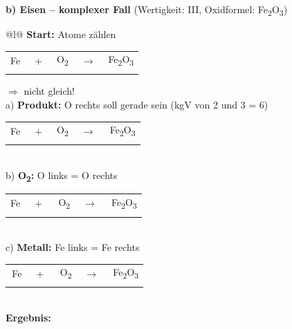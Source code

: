 \documentclass[10pt, a4paper]{article}
\newcommand{\luecke}[1]{\underline{\hspace{#1}}}
\begin{document}
\vspace{8pt}

\textbf{b) Eisen – komplexer Fall} (Wertigkeit: III, Oxidformel: Fe\textsubscript{2}O\textsubscript{3})

\begin{tabular}{@{}l@{}}
\textbf{Start:} Atome zählen \\[0.3em]
\hspace{1em}\begin{tabular}[t]{@{}c@{}c@{}c@{}c@{}c@{}}
Fe & $\;+\;$ & O\textsubscript{2} & $\;\rightarrow\;$ & Fe\textsubscript{2}O\textsubscript{3} \\[-0.2em]
{\scriptsize\luecke{0.4cm}} & & {\scriptsize\luecke{0.4cm}} & & {\scriptsize\luecke{0.4cm}\hspace{0.5em}\luecke{0.4cm}}
\end{tabular} \quad $\Rightarrow$ nicht gleich! \\[0.8em]
%
a) \textbf{Produkt:} O rechts soll gerade sein (kgV von 2 und 3 = 6) \\[0.3em]
\hspace{1em}\begin{tabular}[t]{@{}c@{}c@{}c@{}c@{}c@{}}
Fe & $\;+\;$ & O\textsubscript{2} & $\;\rightarrow\;$ & \luecke{0.4cm}\,Fe\textsubscript{2}O\textsubscript{3} \\[-0.2em]
{\scriptsize\luecke{0.4cm}} & & {\scriptsize\luecke{0.4cm}} & & {\scriptsize\luecke{0.4cm}\hspace{0.5em}\luecke{0.4cm}}
\end{tabular} \\[0.8em]
%
b) \textbf{O\textsubscript{2}:} O links = O rechts \\[0.3em]
\hspace{1em}\begin{tabular}[t]{@{}c@{}c@{}c@{}c@{}c@{}}
Fe & $\;+\;$ & \luecke{0.4cm}\,O\textsubscript{2} & $\;\rightarrow\;$ & \luecke{0.4cm}\,Fe\textsubscript{2}O\textsubscript{3} \\[-0.2em]
{\scriptsize\luecke{0.4cm}} & & {\scriptsize\luecke{0.4cm}} & & {\scriptsize\luecke{0.4cm}\hspace{0.5em}\luecke{0.4cm}}
\end{tabular} \\[0.8em]
%
c) \textbf{Metall:} Fe links = Fe rechts \\[0.3em]
\hspace{1em}\begin{tabular}[t]{@{}c@{}c@{}c@{}c@{}c@{}}
\luecke{0.4cm}\,Fe & $\;+\;$ & \luecke{0.4cm}\,O\textsubscript{2} & $\;\rightarrow\;$ & \luecke{0.4cm}\,Fe\textsubscript{2}O\textsubscript{3} \\[-0.2em]
{\scriptsize\luecke{0.4cm}} & & {\scriptsize\luecke{0.4cm}} & & {\scriptsize\luecke{0.4cm}\hspace{0.5em}\luecke{0.4cm}}
\end{tabular} \\[0.6em]
%
\textbf{Ergebnis:} \fbox{\luecke{0.4cm} Fe + \luecke{0.4cm} O\textsubscript{2} $\rightarrow$ \luecke{0.4cm} Fe\textsubscript{2}O\textsubscript{3}} \\
\end{tabular}
\end{document}
